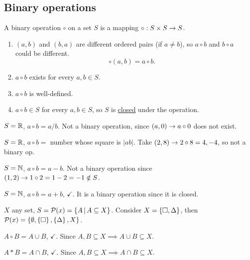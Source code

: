 \documentclass[]{article}
\begin{document}
\subsection{Binary operations}

\begin{definition}
	A binary operation $\circ$ on a set $S$ is a mapping $\circ:S\times S\rightarrow S$.
	\begin{enumerate}
		\item $(a,b)$ and $(b,a)$ are different ordered pairs (if $a\neq b$), so $a\circ b$ and $b\circ a$ could be different. $$\circ(a,b) = a\circ b.$$
		\item $a\circ b$ exists for every $a,b\in S$.
		\item $a\circ b$ is well-defined.
		\item $a\circ b\in S$ for every $a,b\in S$, so $S$ is \ul{closed} under the operation.
	\end{enumerate}
\end{definition}
\begin{example}
	$S = \mathbb{R}$, $a\circ b = a/b$. Not a binary operation, since $(a,0)\rightarrow a\circ 0$ does not exist.
\end{example}
\begin{example}
	$S = \mathbb{R}$, $a\circ b = $ number whose square is $|ab|$. Take $(2,8) \rightarrow 2\circ 8 = 4,-4$, so not a binary op.
\end{example}
\begin{example}
	$S = \mathbb{N}$, $a\circ b = a-b$. Not a binary operation since $(1,2)\rightarrow 1\circ 2=1-2 = -1\notin S$.
\end{example}
\begin{example}
	$S = \mathbb{N}$, $a\circ b = a+b$, $\checkmark$. It is a binary operation since it is closed.
\end{example}
\begin{example}
	$X$ any set, $S = \mathcal{P}(x) = \left\{ A \, \middle| \, A\subseteq X \right\}$. Consider $X = \left\{ \Box,\Delta \right\}$, then $\mathcal{P}(x) = \left\{ \emptyset,\left\{ \Box \right\},\left\{ \Delta \right\},X \right\}$.
\end{example}
\begin{example}
	$A\circ B = A\cup B$, $\checkmark$. Since $A,B\subseteq X \implies A\cup B \subseteq X$.

	$A*B = A\cap B$, $\checkmark$. Since $A,B\subseteq X \implies A\cap B\subseteq X$.
\end{example}
\end{document}
